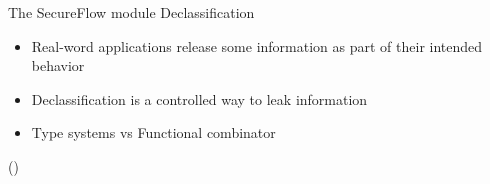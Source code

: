 \begin{frame}{The SecureFlow module \newline Declassification}
	\begin{itemize}
		\item Real-word applications release some information as part of their intended behavior
		\item Declassification is a controlled way to leak information
		\item Type systems vs Functional combinator
	\end{itemize}
	\begin{textblock*}{}()
	\end{textblock*}
\end{frame}
	